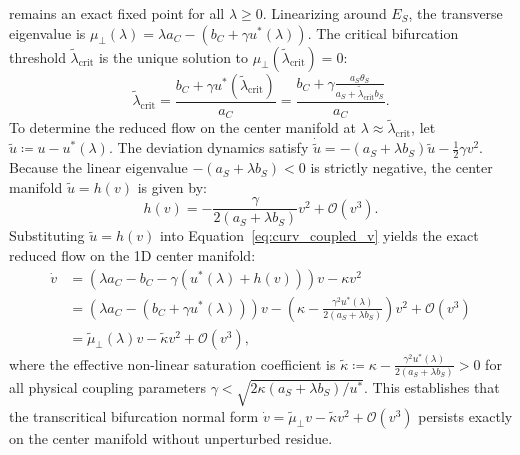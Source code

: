 \documentclass{article}
\theoremstyle{plain}
\theoremstyle{definition}
\begin{document}
remains an exact fixed point for all $\lambda \ge 0$. Linearizing around $E_S$, the transverse eigenvalue is $\mu_\perp(\lambda) = \lambda a_C - \left(b_C + \gamma u^*(\lambda)\right)$. The critical bifurcation threshold $\tilde{\lambda}_{\text{crit}}$ is the unique solution to $\mu_\perp(\tilde{\lambda}_{\text{crit}}) = 0$:
\begin{equation}
    \tilde{\lambda}_{\text{crit}} = \frac{b_C + \gamma u^*(\tilde{\lambda}_{\text{crit}})}{a_C} = \frac{b_C + \gamma \frac{a_S \theta_S}{a_S + \tilde{\lambda}_{\text{crit}} b_S}}{a_C}.
\end{equation}
To determine the reduced flow on the center manifold at $\lambda \approx \tilde{\lambda}_{\text{crit}}$, let $\tilde{u} \coloneqq u - u^*(\lambda)$. The deviation dynamics satisfy $\dot{\tilde{u}} = -(a_S + \lambda b_S) \tilde{u} - \frac{1}{2} \gamma v^2$. Because the linear eigenvalue $-(a_S + \lambda b_S) < 0$ is strictly negative, the center manifold $\tilde{u} = h(v)$ is given by:
\begin{equation}
    h(v) = -\frac{\gamma}{2(a_S + \lambda b_S)} v^2 + \mathcal{O}(v^3).
\end{equation}
Substituting $\tilde{u} = h(v)$ into Equation~\eqref{eq:curv_coupled_v} yields the exact reduced flow on the 1D center manifold:
\begin{align}
    \dot{v} &= \left( \lambda a_C - b_C - \gamma (u^*(\lambda) + h(v)) \right) v - \kappa v^2 \nonumber \\
    &= \left( \lambda a_C - (b_C + \gamma u^*(\lambda)) \right) v - \left( \kappa - \frac{\gamma^2 u^*(\lambda)}{2(a_S + \lambda b_S)} \right) v^2 + \mathcal{O}(v^3) \nonumber \\
    &= \tilde{\mu}_\perp(\lambda) v - \tilde{\kappa} v^2 + \mathcal{O}(v^3),
\end{align}
where the effective non-linear saturation coefficient is $\tilde{\kappa} \coloneqq \kappa - \frac{\gamma^2 u^*(\lambda)}{2(a_S + \lambda b_S)} > 0$ for all physical coupling parameters $\gamma < \sqrt{2 \kappa (a_S + \lambda b_S) / u^*}$. This establishes that the transcritical bifurcation normal form $\dot{v} = \tilde{\mu}_\perp v - \tilde{\kappa} v^2 + \mathcal{O}(v^3)$ persists exactly on the center manifold without unperturbed residue.
\end{document}
